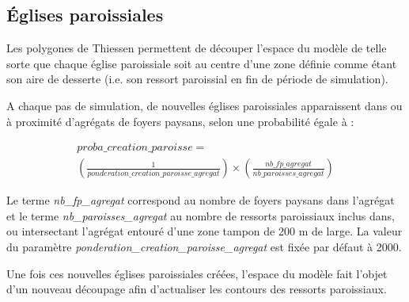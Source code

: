 \documentclass[a4paper,11pt]{article}
\begin{document}
{\subsection{Églises paroissiales}

Les polygones de Thiessen permettent de découper l'espace du modèle de telle sorte que chaque église paroissiale soit au centre d'une zone définie comme étant son aire de desserte (i.e. son ressort paroissial en fin de période de simulation). 

A chaque pas de simulation, de nouvelles églises paroissiales apparaissent dans ou à proximité d'agrégats de foyers paysans, selon une probabilité égale à :
\begin{small}
\begin{equation}
\begin{gathered}
proba\_creation\_paroisse =\\
\left( \frac{1}{ponderation\_creation\_paroisse\_agregat}\right) \times \left( \frac{nb\_fp\_agregat}{nb\_paroisses\_agregat} \right)
\end{gathered}
\end{equation}
\end{small}

\begin{sloppypar}
Le terme \textit{nb\_fp\_agregat} correspond au nombre de foyers paysans dans l'agrégat et le terme \textit{nb\_paroisses\_agregat} au nombre de ressorts paroissiaux inclus dans, ou intersectant l'agrégat entouré d'une zone tampon de 200 m de large. La valeur du paramètre \textit{ponderation\_creation\_paroisse\_agregat} est fixée par défaut à 2000.

Une fois ces nouvelles églises paroissiales créées, l'espace du modèle fait l'objet d'un nouveau découpage afin d'actualiser les contours des ressorts paroissiaux.


\end{sloppypar}}
\end{document}

